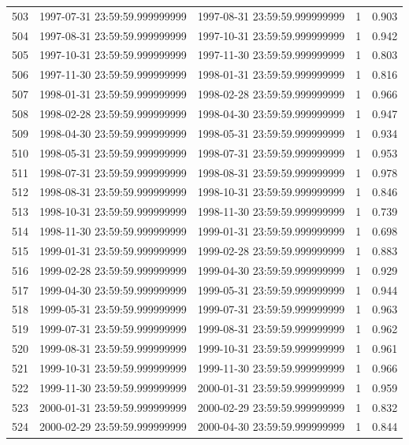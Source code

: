 \begin{table}
\begin{tabular}{lcccc}
503 & 1997-07-31 23:59:59.999999999 & 1997-08-31 23:59:59.999999999 & 1 & 0.903 \\
504 & 1997-08-31 23:59:59.999999999 & 1997-10-31 23:59:59.999999999 & 1 & 0.942 \\
505 & 1997-10-31 23:59:59.999999999 & 1997-11-30 23:59:59.999999999 & 1 & 0.803 \\
506 & 1997-11-30 23:59:59.999999999 & 1998-01-31 23:59:59.999999999 & 1 & 0.816 \\
507 & 1998-01-31 23:59:59.999999999 & 1998-02-28 23:59:59.999999999 & 1 & 0.966 \\
508 & 1998-02-28 23:59:59.999999999 & 1998-04-30 23:59:59.999999999 & 1 & 0.947 \\
509 & 1998-04-30 23:59:59.999999999 & 1998-05-31 23:59:59.999999999 & 1 & 0.934 \\
510 & 1998-05-31 23:59:59.999999999 & 1998-07-31 23:59:59.999999999 & 1 & 0.953 \\
511 & 1998-07-31 23:59:59.999999999 & 1998-08-31 23:59:59.999999999 & 1 & 0.978 \\
512 & 1998-08-31 23:59:59.999999999 & 1998-10-31 23:59:59.999999999 & 1 & 0.846 \\
513 & 1998-10-31 23:59:59.999999999 & 1998-11-30 23:59:59.999999999 & 1 & 0.739 \\
514 & 1998-11-30 23:59:59.999999999 & 1999-01-31 23:59:59.999999999 & 1 & 0.698 \\
515 & 1999-01-31 23:59:59.999999999 & 1999-02-28 23:59:59.999999999 & 1 & 0.883 \\
516 & 1999-02-28 23:59:59.999999999 & 1999-04-30 23:59:59.999999999 & 1 & 0.929 \\
517 & 1999-04-30 23:59:59.999999999 & 1999-05-31 23:59:59.999999999 & 1 & 0.944 \\
518 & 1999-05-31 23:59:59.999999999 & 1999-07-31 23:59:59.999999999 & 1 & 0.963 \\
519 & 1999-07-31 23:59:59.999999999 & 1999-08-31 23:59:59.999999999 & 1 & 0.962 \\
520 & 1999-08-31 23:59:59.999999999 & 1999-10-31 23:59:59.999999999 & 1 & 0.961 \\
521 & 1999-10-31 23:59:59.999999999 & 1999-11-30 23:59:59.999999999 & 1 & 0.966 \\
522 & 1999-11-30 23:59:59.999999999 & 2000-01-31 23:59:59.999999999 & 1 & 0.959 \\
523 & 2000-01-31 23:59:59.999999999 & 2000-02-29 23:59:59.999999999 & 1 & 0.832 \\
524 & 2000-02-29 23:59:59.999999999 & 2000-04-30 23:59:59.999999999 & 1 & 0.844 \\

\end{tabular}
\end{table}
